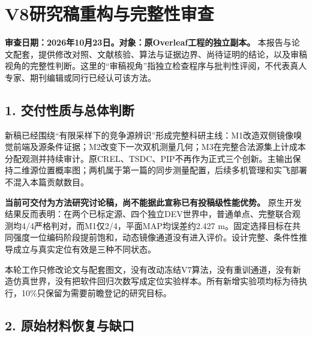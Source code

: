 \hypertarget{v8ux7814ux7a76ux7a3fux91cdux6784ux4e0eux5b8cux6574ux6027ux5ba1ux67e5}{%
\section{V8研究稿重构与完整性审查}\label{v8ux7814ux7a76ux7a3fux91cdux6784ux4e0eux5b8cux6574ux6027ux5ba1ux67e5}}

\textbf{审查日期：2026年10月23日。对象：原Overleaf工程的独立副本。}
本报告与论文配套，提供修改对照、文献核验、算法与证据边界、尚待证明的结论，以及审稿视角的完整性判断。这里的``审稿视角''指独立检查程序与批判性评阅，不代表真人专家、期刊编辑或同行已经认可该方法。

\hypertarget{ux4ea4ux4ed8ux6027ux8d28ux4e0eux603bux4f53ux5224ux65ad}{%
\subsection{1.
交付性质与总体判断}\label{ux4ea4ux4ed8ux6027ux8d28ux4e0eux603bux4f53ux5224ux65ad}}

新稿已经围绕``有限采样下的竞争源辨识''形成完整科研主线：M1改造双侧镜像嗅觉前端及源条件证据；M2改变下一次双机测量几何；M3在完整合法源集上计成本分配观测并持续审计。原CREL、TSDC、PIP不再作为正式三个创新。主输出保持二维源位置概率图；两机属于第一篇的同步测量配置，后续多机管理和实飞部署不混入本篇贡献数目。

\textbf{当前可交付为方法研究讨论稿，尚不能据此宣称已有投稿级性能优势。}
原生开发结果反而表明：在两个已标定源、四个独立DEV世界中，普通单点、完整联合观测均4/4严格判对，而M1仅2/4，平面MAP均误差约2.427
m。固定选择目标在共同强度一位编码阶段提前饱和，动态镜像通道没有进入评价。设计完整、条件性推导成立与真实定位有效是三种不同状态。

本轮工作只修改论文与配套图文，没有改动冻结V7算法，没有重训通道，没有新造仿真世界，没有把软件回归次数写成定位实验样本。所有新增实验项均标为待执行，10\%只保留为需要前瞻登记的研究目标。

\hypertarget{ux539fux59cbux6750ux6599ux6062ux590dux4e0eux7f3aux53e3}{%
\subsection{2.
原始材料恢复与缺口}\label{ux539fux59cbux6750ux6599ux6062ux590dux4e0eux7f3aux53e3}}

